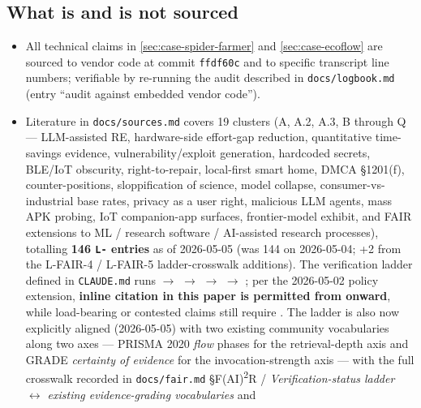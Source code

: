 \documentclass[11pt,a4paper]{article}
\begin{document}
\subsection{What is and is not sourced}
\label{sec:ai-disclosure-sourcing}
\begin{itemize}
  \item All technical claims in \cref{sec:case-spider-farmer} and
        \cref{sec:case-ecoflow} are sourced to vendor code at commit
        \texttt{ffdf60c} and to specific transcript line numbers;
        verifiable by re-running the audit described in
        \texttt{docs/logbook.md} (entry ``audit against embedded vendor
        code'').
  \item Literature in \texttt{docs/sources.md} covers 19 clusters
        (A, A.2, A.3, B through Q --- LLM-assisted RE, hardware-side
        effort-gap reduction, quantitative time-savings evidence,
        vulnerability/exploit generation, hardcoded secrets,
        BLE/IoT obscurity, right-to-repair, local-first smart home,
        DMCA \S 1201(f), counter-positions, sloppification of
        science, model collapse, consumer-vs-industrial base rates,
        privacy as a user right, malicious LLM agents, mass APK
        probing, IoT companion-app surfaces, frontier-model exhibit,
        and FAIR extensions to ML / research software / AI-assisted
        research processes), totalling \textbf{146 \texttt{L-}
        entries} as of 2026-05-05 (was 144 on 2026-05-04; +2 from the
        L-FAIR-4 / L-FAIR-5 ladder-crosswalk additions). The
        verification ladder defined in \texttt{CLAUDE.md} runs
        $\rightarrow$  $\rightarrow$
         $\rightarrow$
        \seqsplit{\texttt{[ai-confirmed]}} $\rightarrow$
        ; per the 2026-05-02 policy
        extension, \textbf{inline citation in this paper is permitted
        from \seqsplit{\texttt{[ai-confirmed]}} onward}, while
        load-bearing or contested claims still require
        . The ladder is also now
        explicitly aligned (2026-05-05) with two existing community
        vocabularies along two axes --- PRISMA 2020 \emph{flow}
        phases for the retrieval-depth axis and GRADE \emph{certainty
        of evidence} for the invocation-strength axis --- with the
        full crosswalk recorded in \texttt{docs/fair.md}
        \S{}F(AI)\textsuperscript{2}R / \emph{Verification-status ladder
        $\leftrightarrow$ existing evidence-grading vocabularies} and

\end{itemize}
\end{document}
